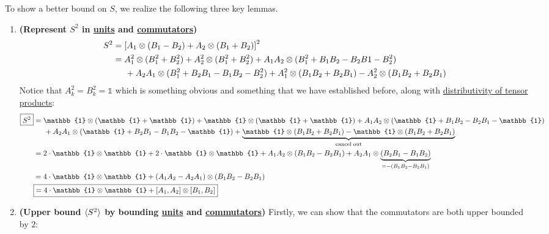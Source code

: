 \documentclass[12pt]{article}
\begin{document}
\begin{lemma}\label{lemma:key-lemma-for-tsirelson-bound}
To show a better bound on $S$, we realize the following three key lemmas.
\begin{enumerate}
    \item \textbf{(Represent $S^2$ in \underline{units} and \underline{commutators})} $$
    \begin{aligned}
    S^2
        &= \sprt{A_1\otimes (B_1 - B_2) + A_2\otimes (B_1 + B_2)}^2 \\
        &= A_1^2\otimes (B_1^2 + B_2^2) + A_2^2\otimes (B_1^2 + B_2^2) + A_1A_2\otimes (B_1^2 + B_1B_2 - B_2B1 - B_2^2)\\
        &\hspace{.5cm}+ A_2A_1\otimes (B_1^2 + B_2B_1 - B_1B_2 - B_2^2) + A_1^2\otimes (B_1B_2 + B_2B_1) - A_2^2\otimes (B_1B_2 + B_2B_1) \\
    \end{aligned}
    $$
    Notice that \underline{$A_k^2 = B_k^2 = \mathbb{1}$} which is something obvious and something that we have established before, along with \underline{distributivity of tensor products}: $$
    \begin{aligned}
    \boxed{S^2}
        &= \mathbb{1}\otimes (\mathbb{1} + \mathbb{1}) + \mathbb{1}\otimes (\mathbb{1} + \mathbb{1}) + A_1A_2\otimes (\mathbb{1} + B_1B_2 - B_2B_1 - \mathbb{1})\\
        &\hspace{.5cm}+ A_2A_1\otimes (\mathbb{1} + B_2B_1 - B_1B_2 - \mathbb{1}) + \underset{\text{cancel out}}{\underbrace{\mathbb{1}\otimes (B_1B_2 + B_2B_1) - \mathbb{1}\otimes (B_1B_2 + B_2B_1)}} \\
        &= 2\cdot \mathbb{1}\otimes \mathbb{1} + 2\cdot \mathbb{1}\otimes \mathbb{1} + A_1A_2\otimes (B_1B_2 - B_2B_1) + A_2A_1\otimes \underset{ = -(B_1B_2 - B_2B_1)}{\underbrace{(B_2B_1 - B_1B_2)}} \\
        &= 4\cdot \mathbb{1}\otimes \mathbb{1} + (A_1A_2 - A_2A_1)\otimes (B_1B_2 - B_2B_1) \\
        &\boxed{= 4\cdot \mathbb{1}\otimes \mathbb{1} + \sprt{A_1, A_2}\otimes \sprt{B_1, B_2}} \\
    \end{aligned}
    $$
    \item \textbf{(Upper bound $\lr{S^2}$ by bounding \underline{units} and \underline{commutators})} Firstly, we can show that the commutators are both upper bounded by $2$: $$
    \begin{aligned}

\end{aligned}$$
\end{enumerate}
\end{lemma}
\end{document}
